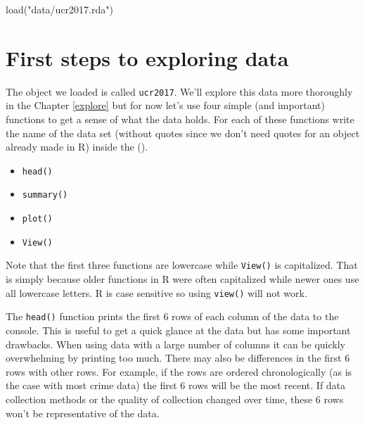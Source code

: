 \documentclass[
]{krantz}
\makeatletter
\newenvironment{Shaded}{\begin{snugshade}}{\end{snugshade}}
\newcommand{\FunctionTok}[1]{\textcolor[rgb]{0,0,0}{#1}}
\newcommand{\NormalTok}[1]{#1}
\newcommand{\StringTok}[1]{\textcolor[rgb]{0.5,0.5,0.5}{#1}}
\providecommand{\tightlist}{%
  \setlength{\itemsep}{0pt}\setlength{\parskip}{0pt}}
\newenvironment{kframe}{%
\medskip{}
\setlength{\fboxsep}{.8em}
 \def\at@end@of@kframe{}%
 \ifinner\ifhmode%
  \def\at@end@of@kframe{\end{minipage}}%
  \begin{minipage}{\columnwidth}%
 \fi\fi%
 \def\FrameCommand##1{\hskip\@totalleftmargin \hskip-\fboxsep
 \colorbox{shadecolor}{##1}\hskip-\fboxsep
     \hskip-\linewidth \hskip-\@totalleftmargin \hskip\columnwidth}%
 \MakeFramed {\advance\hsize-\width
   \@totalleftmargin\z@ \linewidth\hsize
   \@setminipage}}%
 {\par\unskip\endMakeFramed%
 \at@end@of@kframe}
\renewenvironment{Shaded}{\begin{kframe}}{\end{kframe}}
\makeatother
\begin{document}
\begin{Shaded}
\begin{Highlighting}[]
\FunctionTok{load}\NormalTok{(}\StringTok{"data/ucr2017.rda"}\NormalTok{)}
\end{Highlighting}
\end{Shaded}

\hypertarget{first-steps-to-exploring-data}{%
\section{First steps to exploring data}\label{first-steps-to-exploring-data}}

The object we loaded is called \texttt{ucr2017}. We'll explore this data more thoroughly in the Chapter \ref{explore} but for now let's use four simple (and important) functions to get a sense of what the data holds. For each of these functions write the name of the data set (without quotes since we don't need quotes for an object already made in R) inside the ().

\begin{itemize}
\tightlist
\item
  \texttt{head()}
\item
  \texttt{summary()}
\item
  \texttt{plot()}
\item
  \texttt{View()}
\end{itemize}

Note that the first three functions are lowercase while \texttt{View()} is capitalized. That is simply because older functions in R were often capitalized while newer ones use all lowercase letters. R is case sensitive so using \texttt{view()} will not work.

The \texttt{head()} function prints the first 6 rows of each column of the data to the console. This is useful to get a quick glance at the data but has some important drawbacks. When using data with a large number of columns it can be quickly overwhelming by printing too much. There may also be differences in the first 6 rows with other rows. For example, if the rows are ordered chronologically (as is the case with most crime data) the first 6 rows will be the most recent. If data collection methods or the quality of collection changed over time, these 6 rows won't be representative of the data.
\end{document}
